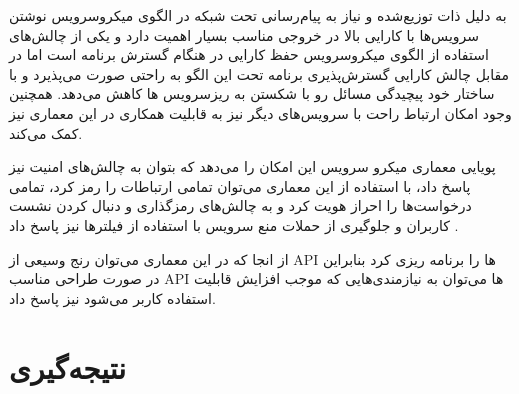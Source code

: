 به دلیل ذات توزیع‌شده و نیاز به پیام‌رسانی تحت شبکه در الگوی میکروسرویس نوشتن سرویس‌ها با کارایی بالا در خروجی مناسب بسیار اهمیت دارد و یکی از چالش‌های استفاده از الگوی میکروسرویس حفظ کارایی در هنگام گسترش برنامه است اما در مقابل چالش کارایی گسترش‌پذیری برنامه تحت این الگو به راحتی صورت می‌پذیرد و با ساختار خود پیچیدگی مسائل رو با شکستن به ریز‌سرویس ها کاهش می‌دهد. همچنین وجود امکان ارتباط راحت با سرویس‌های دیگر نیز به قابلیت همکاری در این معماری نیز کمک می‌کند.

پویایی معماری میکرو سرویس این امکان را می‌دهد که بتوان به چالش‌های امنیت نیز پاسخ داد، با استفاده از این معماری می‌توان تمامی ارتباطات را رمز کرد، تمامی درخواست‌ها را احراز هویت کرد و به چالش‌های رمزگذاری و دنبال کردن نشست کاربران و جلوگیری از حملات منع سرویس با استفاده از فیلترها نیز پاسخ داد \cite{micro_secure} .

از انجا که در این معماری می‌توان رنج وسیعی از API ها را برنامه ریزی کرد بنابراین در صورت طراحی مناسب API ها می‌توان به نیازمندی‌هایی که موجب افزایش قابلیت استفاده کاربر می‌شود نیز پاسخ داد.

\section{نتیجه‌گیری}



















